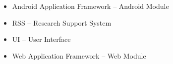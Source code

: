 \begin{itemize}
	\item Android Application Framework -- Android Module
	\item RSS -- Research Support System
	\item UI -- User Interface
	\item Web Application Framework -- Web Module
\end{itemize}

